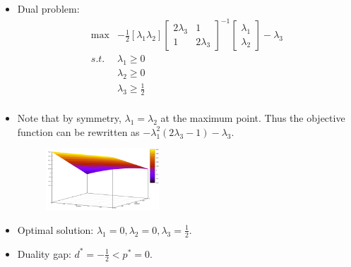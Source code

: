 \documentclass[mathserif]{beamer}
\begin{document}
{\begin{itemize}
\[\begin{array}{lllll}
\begin{cases}
	 \end{cases} 
\end{array}
\]		
(This can be easily derived through setting the gradient $\frac{\partial L}{\partial x_i}=0$ in the case of $\lambda_3 >  \tfrac{1}{2}  $)

	\item Dual problem: 
\[
\begin{array}{rlllll}
 \max &  - \tfrac{1}{2} \left[\lambda_1 \lambda_2 \right] \left[ \begin{matrix}  2\lambda_3 & 1 \\ 1 & 2\lambda_3 \end{matrix} \right]^{-1}  \left[ \begin{matrix} \lambda_1 \\ \lambda_2 \end{matrix}\right]   -\lambda_3   \\
s.t. 	& \lambda_1   \geq  0  \\
 	& \lambda_2  \geq  0  \\
  & \lambda_3  \geq   \tfrac{1}{2}   \\
 \end{array} \nonumber
\]	
\item Note that by symmetry, $\lambda_1 = \lambda_2$ at the maximum point. Thus the objective function can be rewritten as $ - \lambda_1^2 (2\lambda_3 - 1)  -\lambda_3$. 

\begin{figure}
       \includegraphics[width=0.4\textwidth]{L9-Duality-Gap-Example-g-lambda.png}%
\end{figure}
	\item Optimal solution: $\lambda_1 =  0, \lambda_2 = 0, \lambda_3 = \tfrac{1}{2}$. 
	\item Duality gap: $ d^* = -\tfrac{1}{2} < p^* = 0 $. 
\end{itemize}
	
}

\end{document}
